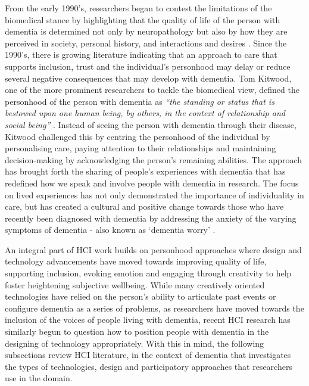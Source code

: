 From the early 1990's, researchers began to contest the limitations of the biomedical stance by highlighting that the quality of life of the person with dementia is determined not only by neuropathology but also by how they are perceived in society, personal history, and interactions and desires \citep{o2007personhood}. Since the 1990's, there is growing literature indicating that an approach to care that supports inclusion, trust and the individual's personhood may delay or reduce several negative consequences that may develop with dementia. Tom Kitwood, one of the more prominent researchers to tackle the biomedical view, defined the personhood of the person with dementia as \textit{``the standing or status that is bestowed upon one human being, by others, in the context of relationship and social being''} \citep[p.8]{kitwood1997dementia}. Instead of seeing the person with dementia through their disease, Kitwood challenged this by centring the personhood of the individual by personalising care, paying attention to their relationships and maintaining decision-making by acknowledging the person's remaining abilities. The approach has brought forth the sharing of people's experiences with dementia that has redefined how we speak and involve people with dementia in research. The focus on lived experiences has not only demonstrated the importance of individuality in care, but has created a cultural and positive change towards those who have recently been diagnosed with dementia by addressing the anxiety of the varying symptoms of dementia - also known as `dementia worry' \citep{kessler_dementia_2012}.

An integral part of HCI work builds on personhood approaches where design and technology advancements have moved towards improving quality of life, supporting inclusion, evoking emotion and engaging through creativity to help foster heightening subjective wellbeing. While many creatively oriented technologies have relied on the person's ability to articulate past events or configure dementia as a series of problems, as researchers have moved towards the inclusion of the voices of people living with dementia, recent HCI research has similarly begun to question how to position people with dementia in the designing of technology appropriately. With this in mind, the following subsections review HCI literature, in the context of dementia that investigates the types of technologies, design and participatory approaches that researchers use in the domain.

